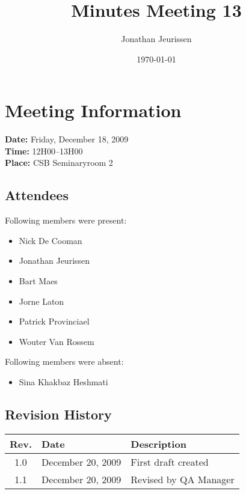 \documentclass[a4paper, 12pt]{article}
\begin{document}
\title{Minutes Meeting 13}
\author{Jonathan Jeurissen}
\date{\today}

\maketitle	
	\section{Meeting Information}
		\textbf{Date:} Friday, December 18, 2009\\
		\textbf{Time:} 12H00--13H00\\
		\textbf{Place:} CSB Seminaryroom 2\\
		\subsection{Attendees}
Following members were present:
			\begin{itemize}
				\item Nick De Cooman
				\item Jonathan Jeurissen
				\item Bart Maes
				\item Jorne Laton
				\item Patrick Provinciael
				\item Wouter Van Rossem
			\end{itemize}
Following members were absent:
			\begin{itemize}
			 \item Sina Khakbaz Heshmati
			\end{itemize}
			
		\subsection{Revision History}
			\begin{tabular}{c | l | l }
				\textbf{Rev.} & \textbf{Date} & \textbf{Description} \\
				\hline
				1.0 & December 20, 2009 & First draft created \\
				1.1 & December 20, 2009 & Revised by QA Manager \\
			\end{tabular}		
\end{document}
